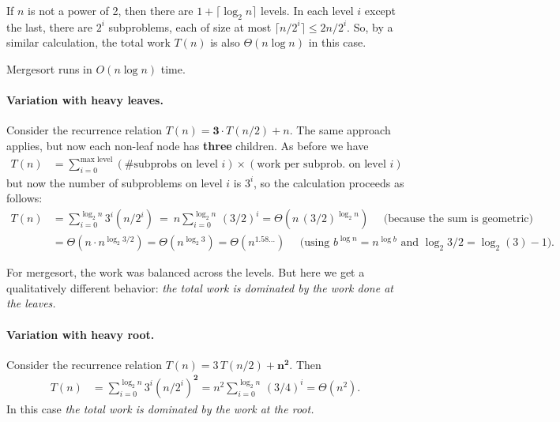 If $n$ is not a power of 2, then there are $1+\lceil \log_2 n \rceil$ levels.
In each level $i$ except the last, there are $2^i$ subproblems,
each of size at most $\lceil n/2^i\rceil \le 2n/2^i$.
So, by a similar calculation, the total work $T(n)$ is also $\Theta(n\log n)$ in this case.

\begin{theorem}
  \textsf{Mergesort} runs in $O(n \log n)$ time.
\end{theorem}

\paragraph{Variation with heavy leaves.}

Consider the recurrence relation $T(n) = \mathbf{3}\cdot T(n/2) + n$.
The same approach applies, but now each non-leaf node has \textbf{three} children.
As before we have
\begin{align*}
  T(n) & {}= \sum_{i=0}^{\text{max level}} (\text{\# subprobs on level } i) \times (\text{work per subprob.~on level } i)
\end{align*}
but now the number of subproblems on level $i$ is $3^i$, so the calculation proceeds as follows:
\begin{align*}
  T(n) & {}= \sum_{i=0}^{\log_2 n} 3^i (n/2^i) ~=~ n \sum_{i=0}^{\log_2 n}\, (3/2)^i
    = \Theta(n\, (3/2)^{\log_2 n})  \text{~~~~(because the sum is geometric)} \\
  & {}= \Theta(n\cdot n^{\log_2 3/2}) = \Theta(n^{\log_2 3}) = \Theta(n^{1.58\ldots})
    \text{~~~~(using $b^{\log n} = n^{\log b}$ and $\log_2 3/2 = \log_2(3) -1$).}
\end{align*}

For \textsf{mergesort}, the work was balanced across the levels.
But here we get a qualitatively different behavior:
\emph{the total work is dominated by the work done at the leaves.}

\paragraph{Variation with heavy root.}
Consider the recurrence relation $T(n) = 3\, T(n/2) + \mathbf{n^2}$.
Then
\begin{align*}
  T(n) & {} = \sum_{i=0}^{\log_2 n} 3^i (n/2^i)^{\mathbf 2} = n^2 \sum_{i=0}^{\log_2 n}\, (3/4)^i
           = \Theta(n^2).
\end{align*}
In this case \emph{the total work is dominated by the work at the root.}

